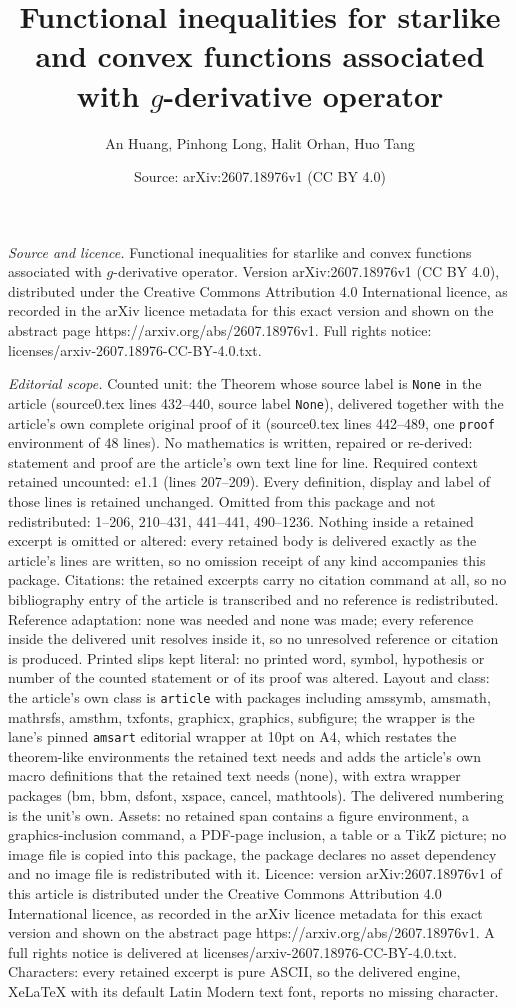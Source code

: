 \documentclass[10pt,a4paper]{amsart}
\title[Functional inequalities for starlike and convex functions as]{Functional inequalities for starlike and convex functions associated with $g$-derivative operator}
\author{An Huang, Pinhong Long, Halit Orhan, Huo Tang}
\date{Source: arXiv:2607.18976v1 (CC BY 4.0)}
\begin{document}
\maketitle

\noindent\emph{Source and licence.} Functional inequalities for starlike and convex functions associated with $g$-derivative operator. Version arXiv:2607.18976v1 (CC BY 4.0), distributed under the Creative Commons Attribution 4.0 International licence, as recorded in the arXiv licence metadata for this exact version and shown on the abstract page https://arxiv.org/abs/2607.18976v1. Full rights notice: licenses/arxiv-2607.18976-CC-BY-4.0.txt.\par\smallskip

\noindent\textit{Editorial scope.} Counted unit: the Theorem whose source label is \texttt{None} in the article (source0.tex lines 432--440, source label \texttt{None}), delivered together with the article's own complete original proof of it (source0.tex lines 442--489, one \texttt{proof} environment of 48 lines). No mathematics is written, repaired or re-derived: statement and proof are the article's own text line for line. Required context retained uncounted: e1.1 (lines 207--209). Every definition, display and label of those lines is retained unchanged. Omitted from this package and not redistributed: 1--206, 210--431, 441--441, 490--1236. Nothing inside a retained excerpt is omitted or altered: every retained body is delivered exactly as the article's lines are written, so no omission receipt of any kind accompanies this package. Citations: the retained excerpts carry no citation command at all, so no bibliography entry of the article is transcribed and no reference is redistributed. Reference adaptation: none was needed and none was made; every reference inside the delivered unit resolves inside it, so no unresolved reference or citation is produced. Printed slips kept literal: no printed word, symbol, hypothesis or number of the counted statement or of its proof was altered. Layout and class: the article's own class is \texttt{article} with packages including amssymb, amsmath, mathrsfs, amsthm, txfonts, graphicx, graphics, subfigure; the wrapper is the lane's pinned \texttt{amsart} editorial wrapper at 10pt on A4, which restates the theorem-like environments the retained text needs and adds the article's own macro definitions that the retained text needs (none), with extra wrapper packages (bm, bbm, dsfont, xspace, cancel, mathtools). The delivered numbering is the unit's own. Assets: no retained span contains a figure environment, a graphics-inclusion command, a PDF-page inclusion, a table or a TikZ picture; no image file is copied into this package, the package declares no asset dependency and no image file is redistributed with it. Licence: version arXiv:2607.18976v1 of this article is distributed under the Creative Commons Attribution 4.0 International licence, as recorded in the arXiv licence metadata for this exact version and shown on the abstract page https://arxiv.org/abs/2607.18976v1. A full rights notice is delivered at licenses/arxiv-2607.18976-CC-BY-4.0.txt. Characters: every retained excerpt is pure ASCII, so the delivered engine, XeLaTeX with its default Latin Modern text font, reports no missing character.
\end{document}
